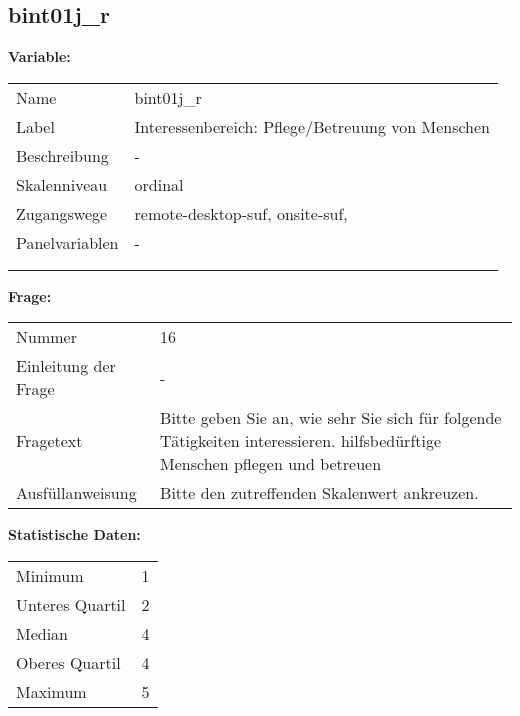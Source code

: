 	
	
	\subsection{bint01j\_r}
	\label{subSection:bint01j_r}

	\noindent\textbf{Variable:}\\
		\begin{tabular}{lL{11.3cm}}
			\label{tableVariable:bint01j_r}
			Name & bint01j\_r \\
			Label & Interessenbereich: Pflege/Betreuung von Menschen \\
			Beschreibung & - \\
			Skalenniveau & ordinal \\
			Zugangswege &
				remote-desktop-suf,
				onsite-suf,
 \\
			Panelvariablen & -
			 \\
			 \\
 \\
		\end{tabular}

		\vspace*{1 cm}
		\noindent\textbf{Frage:}\\
		\begin{tabular}{lL{11.3cm}}
			\label{tableQuestion:bint01j_r}
			Nummer & 16 \\
			Einleitung der Frage & - \\
			Fragetext & Bitte geben Sie an, wie sehr Sie sich für folgende Tätigkeiten interessieren.
hilfsbedürftige Menschen pflegen und betreuen \\
			Ausfüllanweisung & Bitte den zutreffenden Skalenwert ankreuzen. \\
		\end{tabular}


		\vspace*{1 cm}
		\noindent\textbf{Statistische Daten:}\\
			\begin{tabular}{ll}
				\label{tableStatistics:bint01j_r}
					Minimum & 1 \\
					Unteres Quartil & 2 \\
					Median & 4 \\
					Oberes Quartil & 4 \\
					Maximum & 5 \\
			\end{tabular}



